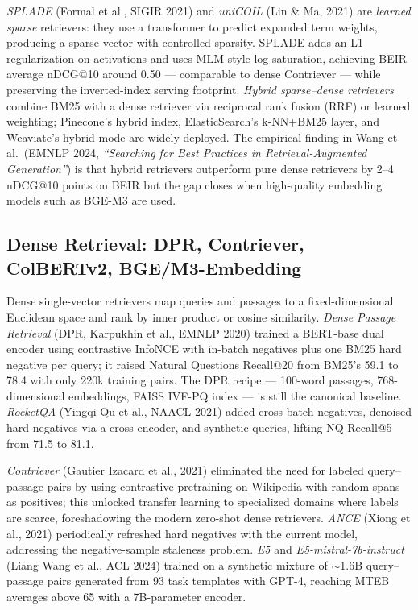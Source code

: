 \documentclass{article}
\begin{document}
\emph{SPLADE} (Formal et al., SIGIR 2021) and \emph{uniCOIL} (Lin \& Ma, 2021) are \emph{learned sparse} retrievers: they use a transformer to predict expanded term weights, producing a sparse vector with controlled sparsity. SPLADE adds an L1 regularization on activations and uses MLM-style log-saturation, achieving BEIR average nDCG@10 around 0.50 --- comparable to dense Contriever --- while preserving the inverted-index serving footprint. \emph{Hybrid sparse--dense retrievers} combine BM25 with a dense retriever via reciprocal rank fusion (RRF) or learned weighting; Pinecone's hybrid index, ElasticSearch's k-NN+BM25 layer, and Weaviate's hybrid mode are widely deployed. The empirical finding in Wang et al.~(EMNLP 2024, \emph{``Searching for Best Practices in Retrieval-Augmented Generation''}) is that hybrid retrievers outperform pure dense retrievers by 2--4 nDCG@10 points on BEIR but the gap closes when high-quality embedding models such as BGE-M3 are used.

\subsection{Dense Retrieval: DPR, Contriever, ColBERTv2, BGE/M3-Embedding}\label{dense-retrieval-dpr-contriever-colbertv2-bgem3-embedding}

Dense single-vector retrievers map queries and passages to a fixed-dimensional Euclidean space and rank by inner product or cosine similarity. \emph{Dense Passage Retrieval} (DPR, Karpukhin et al., EMNLP 2020) trained a BERT-base dual encoder using contrastive InfoNCE with in-batch negatives plus one BM25 hard negative per query; it raised Natural Questions Recall@20 from BM25's 59.1 to 78.4 with only 220k training pairs. The DPR recipe --- 100-word passages, 768-dimensional embeddings, FAISS IVF-PQ index --- is still the canonical baseline. \emph{RocketQA} (Yingqi Qu et al., NAACL 2021) added cross-batch negatives, denoised hard negatives via a cross-encoder, and synthetic queries, lifting NQ Recall@5 from 71.5 to 81.1.

\emph{Contriever} (Gautier Izacard et al., 2021) eliminated the need for labeled query--passage pairs by using contrastive pretraining on Wikipedia with random spans as positives; this unlocked transfer learning to specialized domains where labels are scarce, foreshadowing the modern zero-shot dense retrievers. \emph{ANCE} (Xiong et al., 2021) periodically refreshed hard negatives with the current model, addressing the negative-sample staleness problem. \emph{E5} \citep{wang2023shallwepretrainaut} and \emph{E5-mistral-7b-instruct} (Liang Wang et al., ACL 2024) trained on a synthetic mixture of $\sim$1.6B query--passage pairs generated from 93 task templates with GPT-4, reaching MTEB averages above 65 with a 7B-parameter encoder.
\end{document}
